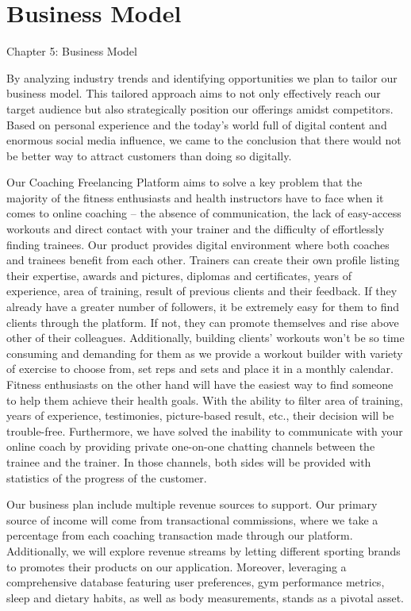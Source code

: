 \section*{Business Model}
Chapter 5: Business Model 

By analyzing industry trends and identifying opportunities we plan to tailor our business model. This tailored approach aims to not only effectively reach our target audience but also strategically position our offerings amidst competitors. Based on personal experience and the today’s world full of digital content and enormous social media influence, we came to the conclusion that there would not be better way to attract customers than doing so digitally.

Our Coaching Freelancing Platform aims to solve a key problem that the majority of the fitness enthusiasts and health instructors have to face when it comes to online coaching – the absence of communication, the lack of easy-access workouts and direct contact with your trainer and the difficulty of effortlessly finding trainees. Our product provides digital environment where both coaches and trainees benefit from each other. Trainers can create their own profile listing their expertise, awards and pictures, diplomas and certificates, years of experience, area of training, result of previous clients and their feedback. If they already have a greater number of followers, it be extremely easy for them to find clients through the platform. If not, they can promote themselves and rise above other of their colleagues. Additionally, building clients’ workouts won’t be so time consuming and demanding for them as we provide a workout builder with variety of exercise to choose from, set reps and sets and place it in a monthly calendar. Fitness enthusiasts on the other hand will have the easiest way to find someone to help them achieve their health goals. With the ability to filter area of training, years of experience, testimonies, picture-based result, etc., their decision will be trouble-free. Furthermore, we have solved the inability to communicate with your online coach by providing private one-on-one chatting channels between the trainee and the trainer. In those channels, both sides will be provided with statistics of the progress of the customer.

Our business plan include multiple revenue sources to support. Our primary source of income will come from transactional commissions, where we take a percentage from each coaching transaction made through our platform. Additionally, we will explore revenue streams by letting different sporting brands to promotes their products on our application. Moreover, leveraging a comprehensive database featuring user preferences, gym performance metrics, sleep and dietary habits, as well as body measurements, stands as a pivotal asset.

